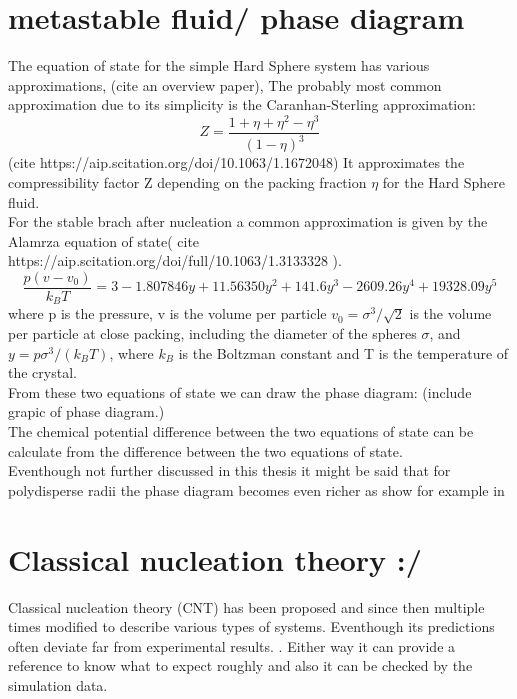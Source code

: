   
\section{metastable fluid/ phase diagram}
\label{sec:HS_phase_diagram}
The equation of state for the simple Hard Sphere system has various approximations, (cite an overview paper), The probably most common approximation due to its simplicity is the Caranhan-Sterling approximation:
\begin{equation}
Z=\frac{1+\eta+\eta^2-\eta^3}{(1-\eta)^3}
\end{equation}
(cite https://aip.scitation.org/doi/10.1063/1.1672048)
It approximates the compressibility factor Z depending on the packing fraction $\eta$ for the Hard Sphere fluid.\\

For the stable brach after nucleation a common approximation is given by the Alamrza equation of state( cite https://aip.scitation.org/doi/full/10.1063/1.3133328 ).
\begin{equation}
\frac{p(v-v_0)}{k_B T} = 3 - 1.807846 y + 11.56350 y^2 + 141.6 y^3 - 2609.26 y^4 + 19328.09 y^5
\end{equation}
where p is the pressure, v is the volume per particle $v_0=\sigma^3/\sqrt{2}$ is the volume per particle at close packing, including the diameter of the spheres $\sigma$, and $y=p \sigma^3 / (k_B T)$, where $k_B$ is the Boltzman constant and T is the temperature of the crystal.\\

From these two equations of state we can draw the phase diagram:
(include grapic of phase diagram.)\\

The chemical potential difference between the two equations of state can be calculate from the difference between the two equations of state.\\

Eventhough not further discussed in this thesis it might be said that for polydisperse radii the phase diagram becomes even richer as show for example in 

\section{Classical nucleation theory :/}
\label{sec:CNT}
Classical nucleation theory (CNT) has been proposed  and since then multiple times modified to describe various types of systems. Eventhough its predictions often deviate far from experimental results. . Either way it can provide a reference to know what to expect roughly and also it can be checked by the simulation data.\\

